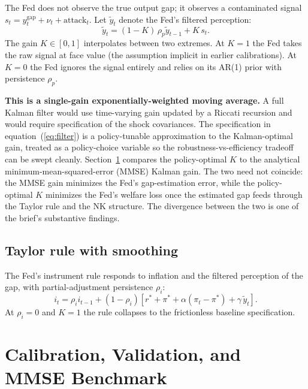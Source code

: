 \documentclass[12pt]{article}
\begin{document}
The Fed does not observe the true output gap; it observes a contaminated signal \(s_t = y^{\text{gap}}_t + \nu_t + \text{attack}_t\). Let \(\widetilde{y}_t\) denote the Fed's filtered perception:
\begin{equation}\label{eq:filter}
\widetilde{y}_t = (1 - K) \, \rho_p \widetilde{y}_{t-1} + K \, s_t.
\end{equation}
The gain \(K \in [0, 1]\) interpolates between two extremes. At \(K = 1\) the Fed takes the raw signal at face value (the assumption implicit in earlier calibrations). At \(K = 0\) the Fed ignores the signal entirely and relies on its AR(1) prior with persistence \(\rho_p\).

\textbf{This is a single-gain exponentially-weighted moving average.} A full Kalman filter would use time-varying gain updated by a Riccati recursion and would require specification of the shock covariances. The specification in equation~(\ref{eq:filter}) is a policy-tunable approximation to the Kalman-optimal gain, treated as a policy-choice variable so the robustness-vs-efficiency tradeoff can be swept cleanly. Section~\ref{sec:calib} compares the policy-optimal \(K\) to the analytical minimum-mean-squared-error (MMSE) Kalman gain. The two need not coincide: the MMSE gain minimizes the Fed's gap-estimation error, while the policy-optimal \(K\) minimizes the Fed's welfare loss once the estimated gap feeds through the Taylor rule and the NK structure. The divergence between the two is one of the brief's substantive findings.

\subsection{Taylor rule with smoothing}

The Fed's instrument rule responds to inflation and the filtered perception of the gap, with partial-adjustment persistence \(\rho_i\):
\begin{equation}
i_t = \rho_i i_{t-1} + (1 - \rho_i)\left[r^* + \pi^* + \alpha (\pi_t - \pi^*) + \gamma \, \widetilde{y}_t\right].
\end{equation}
At \(\rho_i = 0\) and \(K = 1\) the rule collapses to the frictionless baseline specification.

\section{Calibration, Validation, and MMSE Benchmark}\label{sec:calib}
\end{document}
